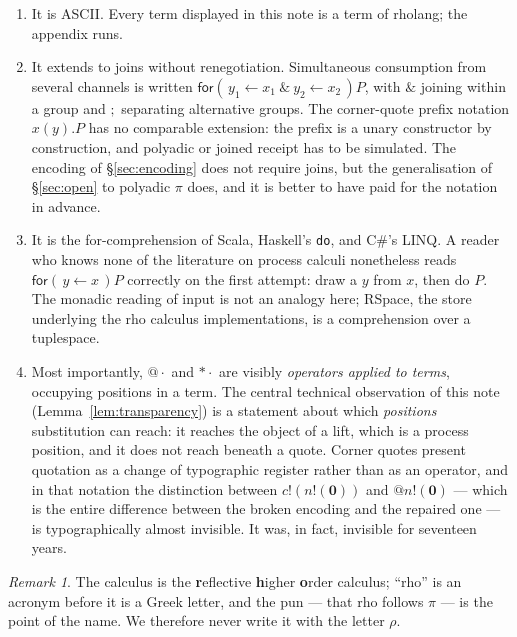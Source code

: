 \documentclass[11pt]{article}
\makeatletter
\theoremstyle{definition}
\theoremstyle{plain}
\theoremstyle{remark}
\newtheorem{remark}[definition]{Remark}
\newcommand{\quo}[1]{@#1}
\newcommand{\drp}[1]{{*}#1}
\newcommand{\inp}[3]{\mathsf{for}(\,#1 \leftarrow #2\,)#3}
\newcommand{\inpp}[5]{\mathsf{for}(\,#1 \leftarrow #2\ \&\ #3 \leftarrow #4\,)#5}
\newcommand{\out}[2]{#1!(#2)}
\newcommand{\nil}{\mathbf{0}}
\makeatother
\begin{document}
\begin{enumerate}[label=(\arabic*),leftmargin=2.2em]
\item It is ASCII. Every term displayed in this note is a term of
rholang; the appendix runs.

\item It extends to joins without renegotiation. Simultaneous consumption
from several channels is written
$\inpp{y_1}{x_1}{y_2}{x_2}{P}$, with $\&$ joining within a group and
$;$ separating alternative groups. The corner-quote prefix notation
$x(y).P$ has no comparable extension: the prefix is a unary constructor
by construction, and polyadic or joined receipt has to be simulated. The
encoding of \S\ref{sec:encoding} does not require joins, but the
generalisation of \S\ref{sec:open} to polyadic $\pi$ does, and it is
better to have paid for the notation in advance.

\item It is the for-comprehension of Scala, Haskell's \texttt{do}, and
C\#'s LINQ. A reader who knows none of the literature on process calculi
nonetheless reads $\inp{y}{x}{P}$ correctly on the first attempt: draw a
$y$ from $x$, then do $P$. The monadic reading of input is not an analogy
here; RSpace, the store underlying the rho calculus implementations, is a
comprehension over a tuplespace.

\item Most importantly, $\quo{\cdot}$ and $\drp{\cdot}$ are visibly
\emph{operators applied to terms}, occupying positions in a term. The
central technical observation of this note
(Lemma~\ref{lem:transparency}) is a statement about which \emph{positions}
substitution can reach: it reaches the object of a lift, which is a
process position, and it does not reach beneath a quote. Corner quotes
present quotation as a change of typographic register rather than as an
operator, and in that notation the distinction between
$\out{c}{\out{n}{\nil}}$ and $\quo{\out{n}{\nil}}$ --- which is the entire
difference between the broken encoding and the repaired one --- is
typographically almost invisible. It was, in fact, invisible for
seventeen years.
\end{enumerate}

\begin{remark}
The calculus is the \textbf{r}eflective \textbf{h}igher \textbf{o}rder
calculus; ``rho'' is an acronym before it is a Greek letter, and the pun
--- that rho follows $\pi$ --- is the point of the name. We therefore
never write it with the letter $\rho$.
\end{remark}
\end{document}
